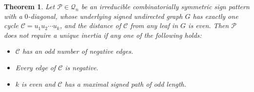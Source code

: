 \documentclass[a4paper, 10pt]{article}
\newtheorem{theorem}{Theorem}[section]
\numberwithin{equation}{section}
\begin{document}
\begin{theorem}\label{xxth3.14}
	Let $\mathcal{P}\in \mathcal{Q}_n$ be an irreducible combinatorially symmetric sign pattern with a $0$-diagonal, whose underlying signed undirected graph $G$ has exactly one cycle $\mathcal{C}=u_1u_2\cdots u_k$, and the distance of $\mathcal{C}$ from any leaf in $G$ is even. Then $\mathcal{P}$ does not require a unique inertia if any one of the following holds:
	\begin{itemize}
		\item[i.] $\mathcal{C}$ has an odd number of negative edges.
		\item[ii.] Every edge of \(\mathcal{C}\) is negative.
		\item[iii.] $k$ is even and $\mathcal{C}$ has a maximal signed path of odd length.
	\end{itemize}
\end{theorem}
\end{document}
